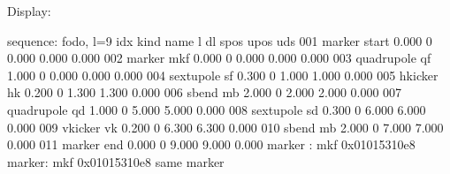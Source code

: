 \documentclass[letterpaper,10pt,english]{sphinxmanual}
\begin{document}
\begin{sphinxVerbatim}[commandchars=\\\{\}]
          
                 
                 
             
        
   
\end{sphinxVerbatim}

\sphinxAtStartPar
Display:

\begin{sphinxVerbatim}[commandchars=\\\{\}]
sequence: fodo, l=9
idx  kind          name          l          dl       spos       upos    uds
001  marker        \PYGZdl{}start  0.000       0       0.000      0.000   0.000
002  marker        mkf     0.000       0       0.000      0.000   0.000
003  quadrupole    qf      1.000       0       0.000      0.000   0.000
004  sextupole     sf      0.300       0       1.000      1.000   0.000
005  hkicker       hk      0.200       0       1.300      1.300   0.000
006  sbend         mb      2.000       0       2.000      2.000   0.000
007  quadrupole    qd      1.000       0       5.000      5.000   0.000
008  sextupole     sd      0.300       0       6.000      6.000   0.000
009  vkicker       vk      0.200       0       6.300      6.300   0.000
010  sbend         mb      2.000       0       7.000      7.000   0.000
011  marker        \PYGZdl{}end    0.000       0       9.000      9.000   0.000
marker : \PYGZsq{}mkf\PYGZsq{} 0x01015310e8  marker: \PYGZsq{}mkf\PYGZsq{} 0x01015310e8 \PYGZhy{}\PYGZhy{} same marker
\end{sphinxVerbatim}
\end{document}
